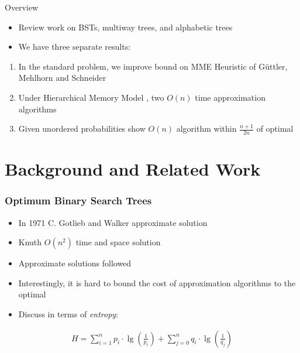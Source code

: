 \documentclass[]{beamer}
\theoremstyle{plain}
\begin{document}
\begin{frame}{Overview}

\begin{itemize}

\item Review work on BSTs, multiway trees, and alphabetic trees

\item We have three separate results:
\end{itemize}

\begin{enumerate}
\item In the standard problem, we improve bound on MME Heuristic of G{\"u}ttler, Mehlhorn and Schneider \cite{guttler1980binary}

\item Under Hierarchical Memory Model \cite{aggarwal1987model}, two $O(n)$ time approximation algorithms

\item Given unordered probabilities show $O(n)$ algorithm within $\frac{n+1}{2n}$ of optimal
\end{enumerate}




\end{frame}

\section{Background and Related Work} \label{Background and Related Work}

\begin{frame} \frametitle{Optimum Binary Search Trees}

\begin{itemize}
\item In 1971 C. Gotlieb and Walker approximate solution \cite{walker1971top}

\item Knuth $O(n^2)$ time and space solution \cite{knuth1971optimum}

\item Approximate solutions followed

\item Interestingly, it is hard to bound the cost of approximation algorithms to the optimal

\item Discuss in terms of \textit{entropy}:
\end{itemize}

\begin{align*}
H = \sum_{i=1}^{n} p_i\cdot\lg(\frac{1}{p_i}) + \sum_{j=0}^{n} q_i\cdot\lg(\frac{1}{q_j})
\end{align*}

\end{frame}
\end{document}
